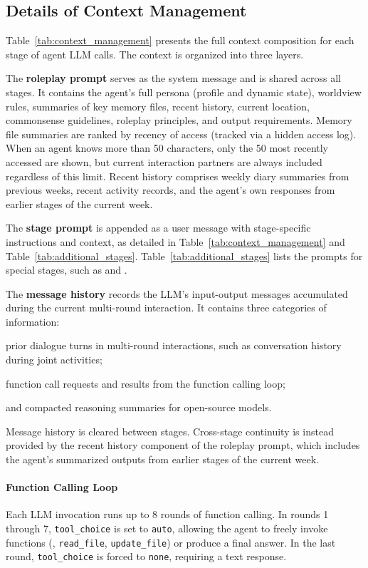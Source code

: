 \subsection{Details of Context Management}
\label{sec:appendix_context}

Table~\ref{tab:context_management} presents the full context composition for each stage of agent LLM calls.
The context is organized into three layers.

The \textbf{roleplay prompt} serves as the system message and is shared across all stages.
It contains the agent's full persona (profile and dynamic state), worldview rules, summaries of key memory files, recent history, current location, commonsense guidelines, roleplay principles, and output requirements.
Memory file summaries are ranked by recency of access (tracked via a hidden access log).
When an agent knows more than 50 characters, only the 50 most recently accessed are shown, but current interaction partners are always included regardless of this limit.
Recent history comprises weekly diary summaries from previous weeks, recent activity records, and the agent's own responses from earlier stages of the current week.

The \textbf{stage prompt} is appended as a user message with stage-specific instructions and context, as detailed in Table~\ref{tab:context_management} and Table~\ref{tab:additional_stages}. 
Table~\ref{tab:additional_stages} lists the prompts for special stages, such as  and .

The \textbf{message history} records the LLM's input-output messages accumulated during the current multi-round interaction.
It contains three categories of information:
\begin{inparaenum}[\it (1)]
\item prior dialogue turns in multi-round interactions, such as conversation history during joint activities;
\item function call requests and results from the function calling loop;
\item and compacted reasoning summaries for open-source models.
\end{inparaenum}
Message history is cleared between stages.
Cross-stage continuity is instead provided by the recent history component of the roleplay prompt, which includes the agent's summarized outputs from earlier stages of the current week.

\paragraph{Function Calling Loop}
Each LLM invocation runs up to 8 rounds of function calling.
In rounds 1 through 7, \texttt{tool\_choice} is set to \texttt{auto}, allowing the agent to freely invoke functions (\eg, \texttt{read\_file}, \texttt{update\_file}) or produce a final answer.
In the last round, \texttt{tool\_choice} is forced to \texttt{none}, requiring a text response.

